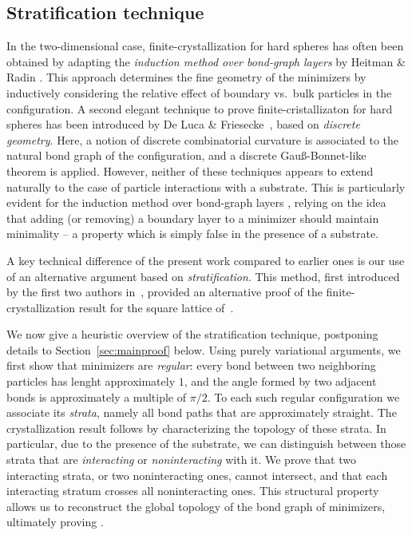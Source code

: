 \documentclass[reqno]{amsart}
\theoremstyle{plain}
\theoremstyle{definition}
\numberwithin{equation}{section}
\begin{document}
\subsection{Stratification technique}\label{sec:stratification} 
In the two-dimensional case, finite-crystallization for hard spheres has often been  obtained
by adapting the {\it induction method over bond-graph layers} by {\sc Heitman \& Radin}
\cite{HR}. This approach determines the fine geometry of
the minimizers by inductively considering the relative
effect of boundary vs.\ bulk particles in the configuration. A second
elegant technique to prove finite-cristallizaton for hard spheres has
been introduced by {\sc De Luca \& Friesecke}~\cite{Lucia},  based on {\it
  discrete geometry}. Here, a notion of discrete combinatorial
curvature is associated to the natural bond graph of the configuration, and a discrete Gau\ss-Bonnet-like
theorem is applied. However, neither of these techniques appears to
extend naturally to the case of particle interactions with a
substrate. This is particularly evident for the induction method over bond-graph layers \cite{HR}, relying on the idea that adding (or removing) a boundary layer to a minimizer should maintain minimality -- a property  which is simply false in the presence of a substrate. 

A key technical difference of the present work compared to earlier
ones is our use of an alternative argument based on   {\it
  stratification}. This method, first introduced by the first two
authors in~\cite{FriedrichKreutz}, provided an alternative
proof  of the finite-crystallization result for the square lattice of~\cite{Mainini-Piovano}.

 We now give a heuristic overview of the stratification technique,
 postponing details to Section~\ref{sec:mainproof} below.  Using purely variational arguments, we first show that minimizers
are {\it regular}: every bond between two neighboring
particles has lenght approximately
$1$, and the angle formed by two adjacent bonds is approximately a
multiple of $\pi/2$. To each such regular configuration we associate
its {\it strata}, namely all bond paths that are approximately
straight. The crystallization result follows by characterizing the
topology of these strata. In particular, due to the presence of the
substrate, we can distinguish between those strata that are {\it interacting} or {\it
  noninteracting} with it. We prove that two interacting strata, or
two noninteracting ones, cannot intersect, and that each interacting stratum crosses all
noninteracting ones. This structural property allows us to reconstruct the global topology of the bond graph of minimizers, ultimately proving .
 
\end{document}

